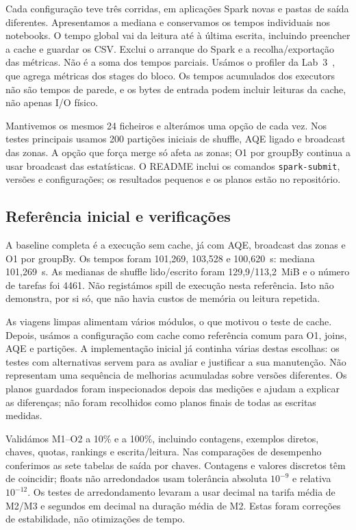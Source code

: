 \documentclass[sigconf]{acmart}
\begin{document}
Cada configuração teve três corridas, em aplicações Spark novas e
pastas de saída diferentes. Apresentamos a mediana e conservamos
os tempos individuais nos notebooks. O tempo global vai da leitura
até à última escrita, incluindo preencher a cache e guardar os CSV.
Exclui o arranque do Spark e a recolha/exportação das métricas.
Não é a soma dos tempos parciais. Usámos o profiler da Lab~3~\cite{lab3},
que agrega métricas dos stages do bloco. Os tempos acumulados dos
executors não são tempos de parede, e os bytes de entrada podem
incluir leituras da cache, não apenas I/O físico.

Mantivemos os mesmos 24 ficheiros e alterámos uma opção de cada vez.
Nos testes principais usamos 200 partições iniciais de shuffle,
AQE ligado e broadcast das zonas. A opção que força merge só afeta
as zonas; O1 por groupBy continua a usar broadcast das estatísticas.
O README inclui os comandos \texttt{spark-submit}, versões e
configurações; os resultados pequenos e os planos estão no repositório.

\subsection{Referência inicial e verificações}
A baseline completa é a execução sem cache, já com AQE, broadcast
das zonas e O1 por groupBy. Os tempos foram 101,269, 103,528 e
100,620~s: mediana 101,269~s. As medianas de shuffle lido/escrito
foram 129,9/113,2~MiB e o número de tarefas foi 4461. Não registámos
spill de execução nesta referência. Isto não demonstra, por si só,
que não havia custos de memória ou leitura repetida.

As viagens limpas alimentam vários módulos, o que motivou o teste de
cache. Depois, usámos a configuração com cache como referência
comum para O1, joins, AQE e partições. A implementação inicial já
continha várias destas escolhas: os testes com alternativas servem
para as avaliar e justificar a sua manutenção. Não representam
uma sequência de melhorias acumuladas sobre versões diferentes.
Os planos guardados foram inspecionados depois das medições e ajudam
a explicar as diferenças; não foram recolhidos como planos finais
de todas as escritas medidas.

Validámos M1--O2 a 10\% e a 100\%, incluindo contagens, exemplos
diretos, chaves, quotas, rankings e escrita/leitura. Nas comparações
de desempenho conferimos as sete tabelas de saída por chaves.
Contagens e valores discretos têm de coincidir; floats não
arredondados usam tolerância absoluta $10^{-9}$ e relativa $10^{-12}$.
Os testes de arredondamento levaram a usar decimal na tarifa média
de M2/M3 e segundos em decimal na duração média de M2. Estas foram
correções de estabilidade, não otimizações de tempo.
\end{document}
